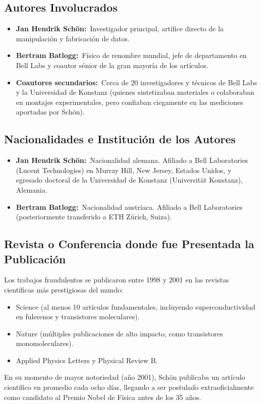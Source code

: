 \documentclass[12pt,a4paper]{article}
\newcommand{\itemlabel}[3]{\textbf{#1#2}~#3}
\begin{document}
\subsection{Autores Involucrados}
\begin{itemize}
\item \itemlabel{Jan Hendrik Schön}{:}{Investigador principal, artífice directo de la manipulación y fabricación de datos.}
\item \itemlabel{Bertram Batlogg}{:}{Físico de renombre mundial, jefe de departamento en Bell Labs y coautor sénior de la gran mayoría de los artículos.}
\item \itemlabel{Coautores secundarios}{:}{Cerca de 20 investigadores y técnicos de Bell Labs y la Universidad de Konstanz (quienes sintetizaban materiales o colaboraban en montajes experimentales, pero confiaban ciegamente en las mediciones aportadas por Schön).}
\end{itemize}
\subsection{Nacionalidades e Institución de los Autores}
\begin{itemize}
\item \itemlabel{Jan Hendrik Schön}{:}{Nacionalidad alemana. Afiliado a Bell Laboratories (Lucent Technologies) en Murray Hill, New Jersey, Estados Unidos, y egresado doctoral de la Universidad de Konstanz (Universität Konstanz), Alemania.}
\item \itemlabel{Bertram Batlogg}{:}{Nacionalidad austríaca. Afiliado a Bell Laboratories (posteriormente transferido a ETH Zúrich, Suiza).}
\end{itemize}
\subsection{Revista o Conferencia donde fue Presentada la Publicación}
Los trabajos fraudulentos se publicaron entre 1998 y 2001 en las revistas científicas más prestigiosas del mundo:
\begin{itemize}
\item Science (al menos 10 artículos fundamentales, incluyendo superconductividad en fulerenos y transistores moleculares).
\item Nature (múltiples publicaciones de alto impacto, como transistores monomoleculares).
\item Applied Physics Letters y Physical Review B.
\end{itemize}
En su momento de mayor notoriedad (año 2001), Schön publicaba un artículo científico en promedio cada ocho días, llegando a ser postulado extraoficialmente como candidato al Premio Nobel de Física antes de los 35 años.
\end{document}
